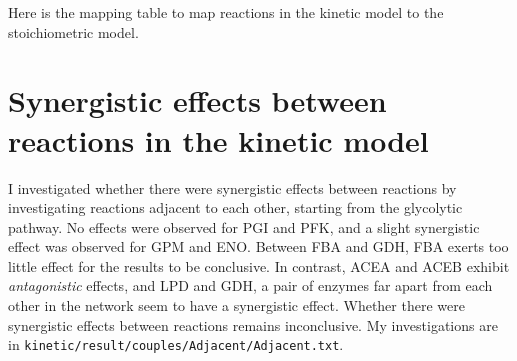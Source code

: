 \documentclass[parskip=full, numbers=noenddot]{scrreprt}
\begin{document}
Here is the mapping table to map reactions in the kinetic model to the stoichiometric model.

\begin{small}
\end{small}





\section{Synergistic effects between reactions in the kinetic model}
\label{ap:synergistic}

I investigated whether there were synergistic effects between reactions by investigating reactions adjacent to each other, starting from the glycolytic pathway. No effects were observed for PGI and PFK, and a slight synergistic effect was observed for GPM and ENO. Between FBA and GDH, FBA exerts too little effect for the results to be conclusive. In contrast, ACEA and ACEB exhibit \emph{antagonistic} effects, and LPD and GDH, a pair of enzymes far apart from each other in the network seem to have a synergistic effect. Whether there were synergistic effects between reactions remains inconclusive. My investigations are in \texttt{kinetic/result/couples/Adjacent/Adjacent.txt}.

\printbibliography
\end{document}
